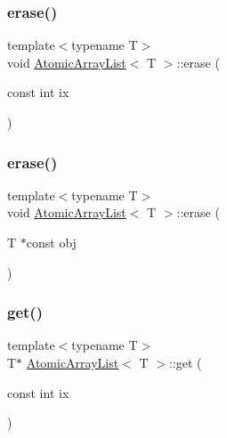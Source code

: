 \mbox{\label{classAtomicArrayList_aaa93ef37c8605757e36dfbeaf46bcc20}} 
\subsubsection{\texorpdfstring{erase()}{erase()}\hspace{0.1cm}{\footnotesize\ttfamily [1/2]}}
{\footnotesize\ttfamily template$<$typename T$>$ \\
void \hyperlink{classAtomicArrayList}{Atomic\+Array\+List}$<$ T $>$\+::erase (\begin{DoxyParamCaption}\item[{const int}]{ix }\end{DoxyParamCaption})\hspace{0.3cm}{\ttfamily [inline]}}

\mbox{\label{classAtomicArrayList_a742e41c76b857c5f6950f47a827524a2}} 
\subsubsection{\texorpdfstring{erase()}{erase()}\hspace{0.1cm}{\footnotesize\ttfamily [2/2]}}
{\footnotesize\ttfamily template$<$typename T$>$ \\
void \hyperlink{classAtomicArrayList}{Atomic\+Array\+List}$<$ T $>$\+::erase (\begin{DoxyParamCaption}\item[{T $\ast$const}]{obj }\end{DoxyParamCaption})\hspace{0.3cm}{\ttfamily [inline]}}

\mbox{\label{classAtomicArrayList_ad8d99fc200487d2fe318538037937090}} 
\subsubsection{\texorpdfstring{get()}{get()}}
{\footnotesize\ttfamily template$<$typename T$>$ \\
T$\ast$ \hyperlink{classAtomicArrayList}{Atomic\+Array\+List}$<$ T $>$\+::get (\begin{DoxyParamCaption}\item[{const int}]{ix }\end{DoxyParamCaption})\hspace{0.3cm}{\ttfamily [inline]}}

